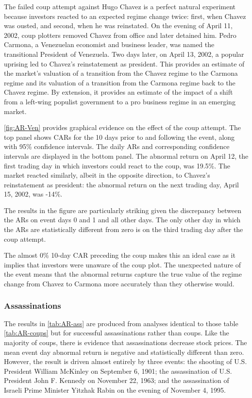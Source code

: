 \documentclass[12pt,final,fleqn]{article}
\theoremstyle{plain}
\begin{document}
The failed coup attempt against Hugo Chavez is a perfect natural experiment because investors reacted to an expected regime change twice: first, when Chavez was ousted, and second, when he was reinstated. On the evening of April 11, 2002, coup plotters removed Chavez from office and later detained him. Pedro Carmona, a Venezuelan economist and business leader, was named the transitional President of Venezuela. Two days later, on April 13, 2002, a popular uprising led to Chavez's reinstatement as president. This provides an estimate of the market's valuation of a transition from the Chavez regime to the Carmona regime and its valuation of a transition from the Carmona regime back to the Chavez regime. By extension, it provides an estimate of the impact of a shift from a left-wing populist government to a pro business regime in an emerging market.

\autoref{fig:AR-Ven} provides graphical evidence on the effect of the coup attempt. The top panel shows CARs for the 10 days prior to and following the event, along with 95\% confidence intervals. The daily ARs and corresponding confidence intervals are displayed in the bottom panel. The abnormal return on April 12, the first trading day in which investors could react to the coup, was 19.5\%. The market reacted similarly, albeit in the opposite direction, to Chavez's reinstatement as president: the abnormal return on the next trading day, April 15, 2002, was -14\%.

The results in the figure are particularly striking given the discrepancy between the ARs on event days 0 and 1 and all other days. The only other day in which the ARs are statistically different from zero is on the third trading day after the coup attempt.

The almost 0\% 10-day CAR preceding the coup makes this an ideal case as it implies that investors were unaware of the coup plot. The unexpected nature of the event means that the abnormal returns capture the true value of the regime change from Chavez to Carmona more accurately than they otherwise would.

\subsubsection{Assassinations} \label{subsec: Assassinations}

The results in \autoref{tab:AR-ass} are produced from analyses identical to those table \autoref{tab:AR-coups} but for successful assassinations rather than coups. Like the majority of coups, there is evidence that assassinations decrease stock prices. The mean event day abnormal return is negative and statistically different than zero. However, the result is driven almost entirely by three events: the shooting of U.S. President William McKinley on September 6, 1901; the assassination of U.S. President John F. Kennedy on November 22, 1963; and the assassination of Israeli Prime Minister Yitzhak Rabin on the evening of November 4, 1995.
\end{document}
